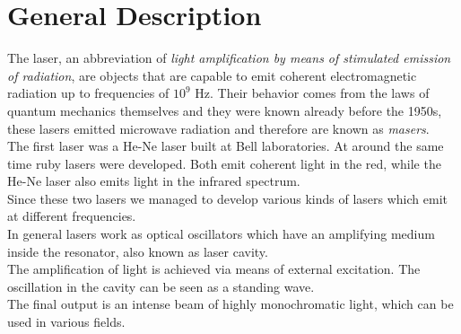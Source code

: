 \documentclass[../electromagnetism.tex]{subfiles}
\begin{document}
\section{General Description}
The laser, an abbreviation of \textit{light amplification by means of stimulated emission of radiation}, are objects that are capable to emit coherent electromagnetic radiation up to frequencies of $10^9$ Hz. Their behavior comes from the laws of quantum mechanics themselves and they were known already before the 1950s, these lasers emitted microwave radiation and therefore are known as \textit{masers}.\\
The first laser was a He-Ne laser built at Bell laboratories. At around the same time ruby lasers were developed. Both emit coherent light in the red, while the He-Ne laser also emits light in the infrared spectrum.\\
Since these two lasers we managed to develop various kinds of lasers which emit at different frequencies.\\
In general lasers work as optical oscillators which have an amplifying medium inside the resonator, also known as laser cavity.\\
The amplification of light is achieved via means of external excitation. The oscillation in the cavity can be seen as a standing wave.\\
The final output is an intense beam of highly monochromatic light, which can be used in various fields.
\end{document}
